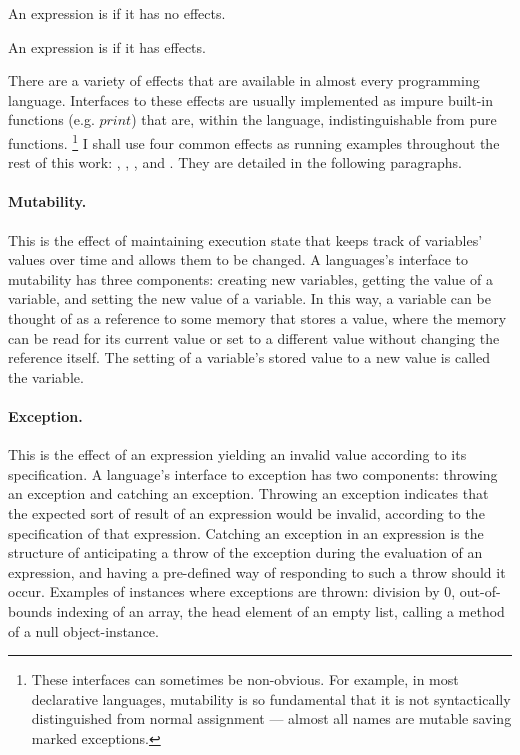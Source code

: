 \begin{blockdefinition}
  An expression is  if it has no effects.
\end{blockdefinition}

\begin{blockdefinition}
  An expression is  if it has effects.
\end{blockdefinition}

There are a variety of effects that are available in almost every programming language.
Interfaces to these effects are usually implemented as impure built-in functions (e.g. $print$) that are, within the language, indistinguishable from pure functions.%
\footnote{
  These interfaces can sometimes be non-obvious.
  For example, in most declarative languages, mutability is so fundamental that it is not syntactically distinguished from normal assignment --- almost all names are mutable saving marked exceptions.
}
I shall use four common effects as running examples throughout the rest of this work: , , , and .
They are detailed in the following paragraphs.

\paragraph{Mutability.}
This is the effect of maintaining execution state that keeps track of variables' values over time and allows them to be changed.
A languages's interface to mutability has three components: creating new variables, getting the value of a variable, and setting the new value of a variable.
In this way, a variable can be thought of as a reference to some memory that stores a value, where the memory can be read for its current value or set to a different value without changing the reference itself.
The setting of a variable's stored value to a new value is called  the variable.

\paragraph{Exception.}
This is the effect of an expression yielding an invalid value according to its specification.
A language's interface to exception has two components: throwing an exception and catching an exception.
Throwing an exception indicates that the expected sort of result of an expression would be invalid, according to the specification of that expression.
Catching an exception in an expression is the structure of anticipating a throw of the exception during the evaluation of an expression, and having a pre-defined way of responding to such a throw should it occur.
Examples of instances where exceptions are thrown: division by $0$, out-of-bounds indexing of an array, the head element of an empty list, calling a method of a null object-instance.

